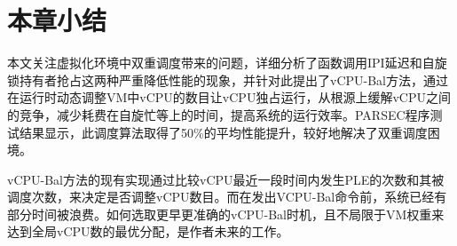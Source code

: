 \section{本章小结}

本文关注虚拟化环境中双重调度带来的问题，详细分析了函数调用IPI延迟和自旋锁持有者抢占这两种严重降低性能的现象，并针对此提出了vCPU-Bal方法，通过在运行时动态调整VM中vCPU的数目让vCPU独占运行，从根源上缓解vCPU之间的竞争，减少耗费在自旋忙等上的时间，提高系统的运行效率。PARSEC程序测试结果显示，此调度算法取得了50\%的平均性能提升，较好地解决了双重调度困境。

vCPU-Bal方法的现有实现通过比较vCPU最近一段时间内发生PLE的次数和其被调度次数，来决定是否调整vCPU数目。而在发出VCPU-Bal命令前，系统已经有部分时间被浪费。如何选取更早更准确的vCPU-Bal时机，且不局限于VM权重来达到全局vCPU数的最优分配，是作者未来的工作。